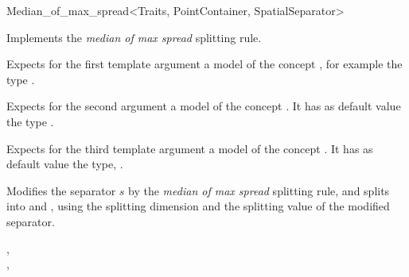 

\begin{ccRefFunctionObjectClass}{Median_of_max_spread<Traits, PointContainer, SpatialSeparator>}

\ccDefinition
Implements the {\em median of max spread} splitting rule.


\ccParameters

Expects for the first template argument a model of
the concept , for example
the type . 

Expects for the second argument a model of the concept . It has as default value
the type .

Expects for the third template argument a model of the concept . It has as default value
the type, .



\ccIsModel


\ccTypes



\ccOperations

{Modifies the separator $s$ by the {\em median of max spread} splitting rule, 
and splits  into  and ,
using the splitting dimension and the splitting value of the modified separator.
}

\ccSeeAlso

,\\
,\\


\end{ccRefFunctionObjectClass}



